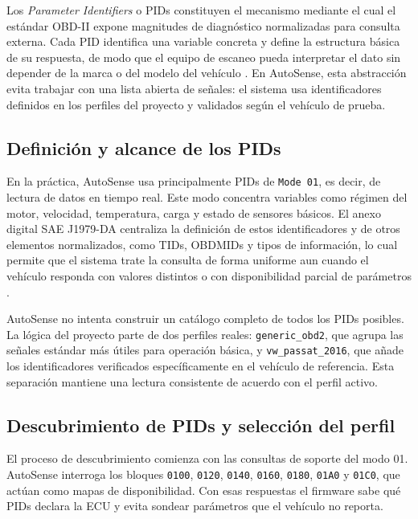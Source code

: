 \documentclass[12pt,letterpaper]{report}
\begin{document}
Los \textit{Parameter Identifiers} o PIDs constituyen el mecanismo mediante el cual el estándar OBD-II expone magnitudes de diagnóstico normalizadas para consulta externa. Cada PID identifica una variable concreta y define la estructura básica de su respuesta, de modo que el equipo de escaneo pueda interpretar el dato sin depender de la marca o del modelo del vehículo \cite{sae2022_j1978_obdii_scan_tool,sae2025_j1979_diagnostic_test_modes,sae2011_j1979_da}. En AutoSense, esta abstracción evita trabajar con una lista abierta de señales: el sistema usa identificadores definidos en los perfiles del proyecto y validados según el vehículo de prueba.

\subsection{Definición y alcance de los PIDs}

En la práctica, AutoSense usa principalmente PIDs de \texttt{Mode 01}, es decir, de lectura de datos en tiempo real. Este modo concentra variables como régimen del motor, velocidad, temperatura, carga y estado de sensores básicos. El anexo digital SAE J1979-DA centraliza la definición de estos identificadores y de otros elementos normalizados, como TIDs, OBDMIDs y tipos de información, lo cual permite que el sistema trate la consulta de forma uniforme aun cuando el vehículo responda con valores distintos o con disponibilidad parcial de parámetros \cite{sae2025_j1979_diagnostic_test_modes,sae2011_j1979_da}.

AutoSense no intenta construir un catálogo completo de todos los PIDs posibles. La lógica del proyecto parte de dos perfiles reales: \texttt{generic\_obd2}, que agrupa las señales estándar más útiles para operación básica, y \texttt{vw\_passat\_2016}, que añade los identificadores verificados específicamente en el vehículo de referencia. Esta separación mantiene una lectura consistente de acuerdo con el perfil activo.

\subsection{Descubrimiento de PIDs y selección del perfil}

El proceso de descubrimiento comienza con las consultas de soporte del modo 01. AutoSense interroga los bloques \texttt{0100}, \texttt{0120}, \texttt{0140}, \texttt{0160}, \texttt{0180}, \texttt{01A0} y \texttt{01C0}, que actúan como mapas de disponibilidad. Con esas respuestas el firmware sabe qué PIDs declara la ECU y evita sondear parámetros que el vehículo no reporta.
\end{document}
